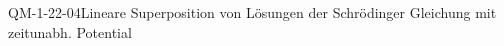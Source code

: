 
\begin{CONC}{QM-1-22-04}{Lineare Superposition von Lösungen der Schrödinger Gleichung mit zeitunabh. Potential}
\end{CONC}
